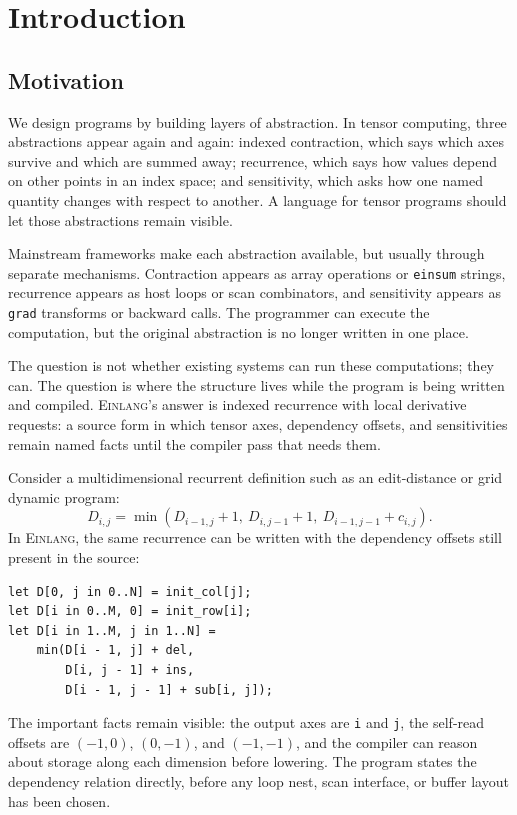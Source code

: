 \documentclass[sigplan,screen,nonacm]{acmart}
\newcommand{\einlang}{\textsc{Einlang}}
\begin{document}


\maketitle

\section{Introduction}

\subsection{Motivation}

We design programs by building layers of abstraction. In tensor computing, three abstractions appear again and again: indexed contraction, which says which axes survive and which are summed away; recurrence, which says how values depend on other points in an index space; and sensitivity, which asks how one named quantity changes with respect to another. A language for tensor programs should let those abstractions remain visible.

Mainstream frameworks make each abstraction available, but usually through separate mechanisms. Contraction appears as array operations or \texttt{einsum} strings, recurrence appears as host loops or scan combinators, and sensitivity appears as \texttt{grad} transforms or backward calls. The programmer can execute the computation, but the original abstraction is no longer written in one place.

The question is not whether existing systems can run these computations; they can. The question is where the structure lives while the program is being written and compiled. \einlang{}'s answer is indexed recurrence with local derivative requests: a source form in which tensor axes, dependency offsets, and sensitivities remain named facts until the compiler pass that needs them.

Consider a multidimensional recurrent definition such as an edit-distance or grid dynamic program:
\[
D_{i,j} = \min(D_{i-1,j}+1,\ D_{i,j-1}+1,\ D_{i-1,j-1}+c_{i,j}).
\]
In \einlang{}, the same recurrence can be written with the dependency offsets still present in the source:
\begin{lstlisting}[style=einlang]
let D[0, j in 0..N] = init_col[j];
let D[i in 0..M, 0] = init_row[i];
let D[i in 1..M, j in 1..N] =
    min(D[i - 1, j] + del,
        D[i, j - 1] + ins,
        D[i - 1, j - 1] + sub[i, j]);
\end{lstlisting}
The important facts remain visible: the output axes are \texttt{i} and \texttt{j}, the self-read offsets are $(-1,0)$, $(0,-1)$, and $(-1,-1)$, and the compiler can reason about storage along each dimension before lowering. The program states the dependency relation directly, before any loop nest, scan interface, or buffer layout has been chosen.
\end{document}
